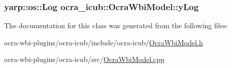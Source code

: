 \hypertarget{classocra__icub_1_1OcraWbiModel_a047fe9f9a96794af218ea844f09cd402}{
\subsubsection[{y\-Log}]{\setlength{\rightskip}{0pt plus 5cm}yarp\-::os\-::\-Log {\bf ocra\-\_\-icub\-::\-Ocra\-Wbi\-Model\-::y\-Log}}}\label{classocra__icub_1_1OcraWbiModel_a047fe9f9a96794af218ea844f09cd402}


\-The documentation for this class was generated from the following files\-:\begin{DoxyCompactItemize}
\item 
ocra-\/wbi-\/plugins/ocra-\/icub/include/ocra-\/icub/\hyperlink{OcraWbiModel_8h}{\-Ocra\-Wbi\-Model.\-h}\item 
ocra-\/wbi-\/plugins/ocra-\/icub/src/\hyperlink{OcraWbiModel_8cpp}{\-Ocra\-Wbi\-Model.\-cpp}\end{DoxyCompactItemize}
